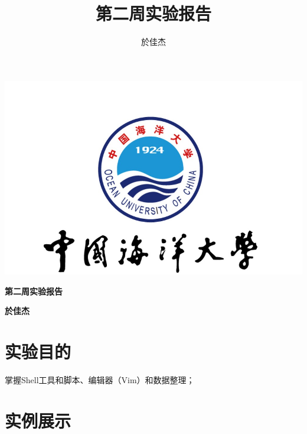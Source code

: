 \documentclass[UTF8]{ctexart}
\begin{document}
\begin{center}
    \includegraphics[width=\textwidth]{o} %
\end{center}

\begin{center}
    \huge\textbf{第二周实验报告}
\end{center}

\begin{center}
    \huge\textbf{於佳杰}
\end{center}
\newpage

\title{第二周实验报告}
\author{於佳杰}
\maketitle

\tableofcontents
\newpage
{}




\section{实验目的}
{\color{red}掌握Shell工具和脚本、编辑器（Vim）和数据整理；}
\section{实例展示}

\end{document}
